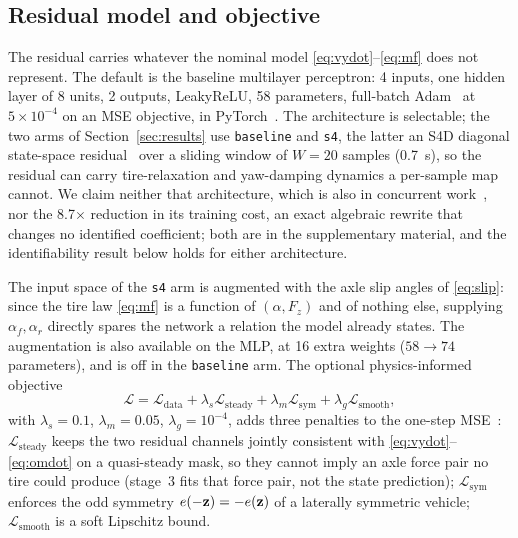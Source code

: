 \subsection{Residual model and objective}
\label{subsec:physinputs}

The residual carries whatever the nominal model
\eqref{eq:vydot}--\eqref{eq:mf} does not represent. The default is the baseline
multilayer perceptron: 4 inputs, one hidden layer of 8 units, 2 outputs,
LeakyReLU, 58 parameters, full-batch Adam~\cite{kingma2015adam} at
$5\times10^{-4}$ on an MSE objective, in PyTorch~\cite{paszke2019pytorch}. The
architecture is selectable; the two arms of Section~\ref{sec:results} use
\texttt{baseline} and \texttt{s4}, the latter an S4D diagonal state-space
residual~\cite{gu2022s4d} over a sliding window of $W=20$ samples
(\SI{0.7}{\second}), so the residual can carry tire-relaxation and yaw-damping
dynamics a per-sample map cannot. We claim neither that architecture, which is
also in concurrent work~\cite{visionsysid2026}, nor the \num{8.7}$\times$
reduction in its training cost, an exact algebraic rewrite that changes no
identified coefficient; both are in the supplementary material, and the
identifiability result below holds for either architecture.

The input space of the \texttt{s4} arm is augmented with the axle slip angles
of \eqref{eq:slip}: since the tire law \eqref{eq:mf} is a function of
$(\alpha,F_{z})$ and of nothing else, supplying $\alpha_{f},\alpha_{r}$
directly spares the network a relation the model already states. The
augmentation is also available on the MLP, at 16 extra weights
($58\rightarrow74$ parameters), and is off in the \texttt{baseline} arm. The optional physics-informed objective
\begin{equation}
\mathcal{L}=\mathcal{L}_{\mathrm{data}}
+\lambda_{s}\mathcal{L}_{\mathrm{steady}}
+\lambda_{m}\mathcal{L}_{\mathrm{sym}}
+\lambda_{g}\mathcal{L}_{\mathrm{smooth}},
\label{eq:pinnloss}
\end{equation}
with $\lambda_{s}=0.1$, $\lambda_{m}=0.05$, $\lambda_{g}=10^{-4}$, adds three
penalties to the one-step MSE~\cite{raissi2019pinn,deepdynamics2024}:
$\mathcal{L}_{\mathrm{steady}}$ keeps the two residual channels jointly
consistent with \eqref{eq:vydot}--\eqref{eq:omdot} on a quasi-steady mask, so
they cannot imply an axle force pair no tire could produce (stage~3 fits that
force pair, not the state prediction);
$\mathcal{L}_{\mathrm{sym}}$ enforces the odd symmetry $e(-\mathbf{z})=-e(\mathbf{z})$ of
a laterally symmetric vehicle; $\mathcal{L}_{\mathrm{smooth}}$ is a soft
Lipschitz bound.

